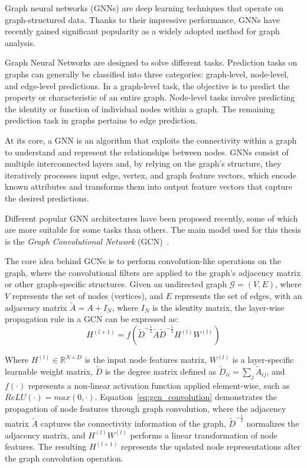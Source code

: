 \documentclass[11pt,a4paper,twocolumn]{article}
\begin{document}
Graph neural networks (GNNs) are deep learning techniques that operate on graph-structured data.
Thanks to their impressive performance, GNNs have recently gained significant popularity as a widely adopted method for graph analysis.

Graph Neural Networks are designed to solve different tasks.
Prediction tasks on graphs can generally be classified into three categories: graph-level, node-level, and edge-level predictions.
In a graph-level task, the objective is to predict the property or characteristic of an entire graph.
Node-level tasks involve predicting the identity or function of individual nodes within a graph.
The remaining prediction task in graphs pertains to edge prediction.

At its core, a GNN is an algorithm that exploits the connectivity within a graph to understand and represent the relationships between nodes.
GNNs consist of multiple interconnected layers and, by relying on the graph's structure, they iteratively processes input edge, vertex, and graph feature vectors, which encode known attributes and transforms them into output feature vectors that capture the desired predictions.

Different popular GNN architectures have been proposed recently, some of which are more suitable for some tasks than others.
The main model used for this thesis is the \textit{Graph Convolutional Network} (GCN)~\cite{DBLP:journals/corr/KipfW16}.

The core idea behind GCNs is to perform convolution-like operations on the graph, where the convolutional filters are applied to the graph's adjacency matrix or other graph-specific structures.
Given an undirected graph $\mathcal{G} = (V, E)$, where $V$ represents the set of nodes (vertices), and $E$ represents the set of edges, with an adjacency matrix $\tilde{A}=A+I_N$, where $I_N$ is the identity matrix, the layer-wise propagation rule in a GCN can be expressed as:
\begin{equation}
    \label{eq:gcn_convolution}
    H^{(l+1)} = f \left( \tilde{D}^{-\tfrac{1}{2}}  \tilde{A}  \tilde{D}^{-\tfrac{1}{2}}  H^{(l)}  W^{(l)} \right)
\end{equation}

Where $H^{(l)} \in \mathbb{R} ^{N \times D}$ is the input node features matrix, $W^{(l)}$ is a layer-specific learnable weight matrix, $\tilde{D}$ is the degree matrix defined as $\tilde{D}_{ii} = \sum_{j} \tilde{A}_{ij}$, and $f(\cdot)$ represents a non-linear activation function applied element-wise, such as $ReLU(\cdot) = max(0, \cdot)$.
Equation~\ref{eq:gcn_convolution} demonstrates the propagation of node features through graph convolution, where the adjacency matrix $\tilde{A}$ captures the connectivity information of the graph, $\tilde{D}^{-\tfrac{1}{2}}$ normalizes the adjacency matrix, and $H^{(l)}  W^{(l)}$ performs a linear transformation of node features.
The resulting $H^{(l+1)}$ represents the updated node representations after the graph convolution operation.
\end{document}
